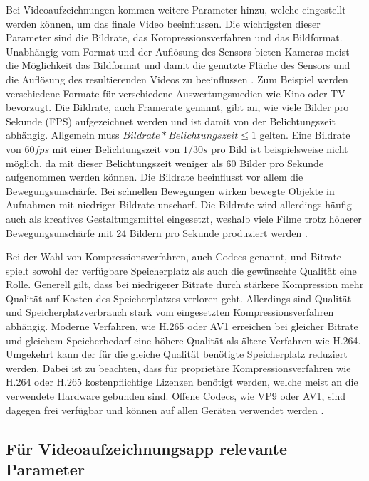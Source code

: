 Bei Videoaufzeichnungen kommen weitere Parameter hinzu, welche eingestellt werden können, um das finale Video beeinflussen.
Die wichtigsten dieser Parameter sind die Bildrate, das Kompressionsverfahren und das Bildformat.
Unabhängig vom Format und der Auflösung des Sensors bieten Kameras meist die Möglichkeit das Bildformat und damit die genutzte Fläche des Sensors und die Auflösung des resultierenden Videos zu beeinflussen \cite[S. 422]{Schmidt_Videotechnik}.
Zum Beispiel werden verschiedene Formate für verschiedene Auswertungsmedien wie Kino oder TV bevorzugt.
Die Bildrate, auch Framerate genannt, gibt an, wie viele Bilder pro Sekunde (\ac{FPS}) aufgezeichnet werden und ist damit von der Belichtungszeit abhängig.
Allgemein muss $Bildrate * Belichtungszeit \leq 1$ gelten.
Eine Bildrate von $60 fps$ mit einer Belichtungszeit von $1/30 s$ pro Bild ist beispielsweise nicht möglich, da mit dieser Belichtungszeit weniger als 60 Bilder pro Sekunde aufgenommen werden können.
Die Bildrate beeinflusst vor allem die Bewegungsunschärfe.
Bei schnellen Bewegungen wirken bewegte Objekte in Aufnahmen mit niedriger Bildrate unscharf.
Die Bildrate wird allerdings häufig auch als kreatives Gestaltungsmittel eingesetzt, weshalb viele Filme trotz höherer Bewegungsunschärfe mit 24 Bildern pro Sekunde produziert werden \cite[S. 174f.]{Schmidt_Videotechnik}.

Bei der Wahl von Kompressionsverfahren, auch Codecs genannt, und Bitrate spielt sowohl der verfügbare Speicherplatz als auch die gewünschte Qualität eine Rolle.
Generell gilt, dass bei niedrigerer Bitrate durch stärkere Kompression mehr Qualität auf Kosten des Speicherplatzes verloren geht.
Allerdings sind Qualität und Speicherplatzverbrauch stark vom eingesetzten Kompressionsverfahren abhängig.
Moderne Verfahren, wie H.265 oder AV1 erreichen bei gleicher Bitrate und gleichem Speicherbedarf eine höhere Qualität als ältere Verfahren wie H.264.
Umgekehrt kann der für die gleiche Qualität benötigte Speicherplatz reduziert werden.
Dabei ist zu beachten, dass für proprietäre Kompressionsverfahren wie H.264 oder H.265 kostenpflichtige Lizenzen benötigt werden, welche meist an die verwendete Hardware gebunden sind.
Offene Codecs, wie VP9 oder AV1, sind dagegen frei verfügbar und können auf allen Geräten verwendet werden \cite[S. 253ff.]{Schmidt_Videotechnik}.


\subsection{Für Videoaufzeichnungsapp relevante Parameter}
\label{sec:relevante_parameter}

